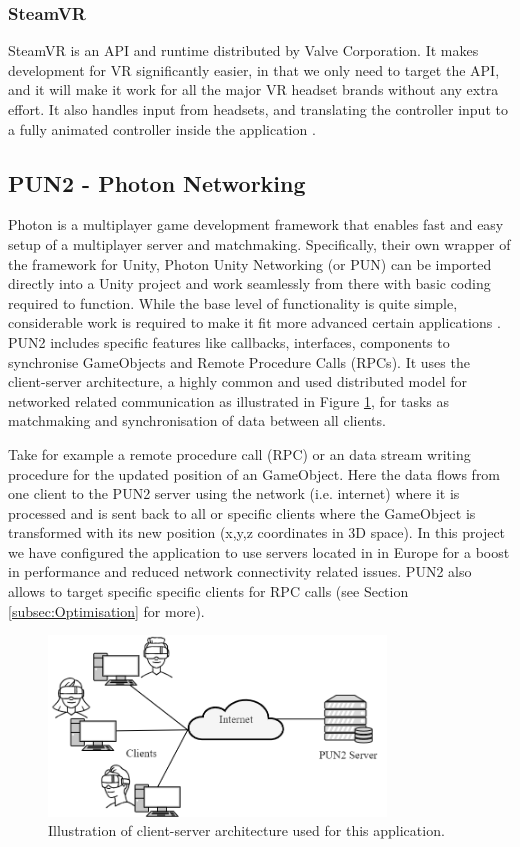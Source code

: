 \subsubsection{SteamVR}
SteamVR is an API and runtime distributed by Valve Corporation. It makes development for VR significantly easier, in that we only need to target the API, and it will make it work for all the major VR headset brands without any extra effort. It also handles input from headsets, and translating the controller input to a fully animated controller inside the application \cite{steamVR}\cite{steamVRAPI}.

\subsection{PUN2 - Photon Networking}
Photon is a multiplayer game development framework that enables fast and easy setup of a multiplayer server and matchmaking. Specifically, their own wrapper of the framework for Unity, Photon Unity Networking (or PUN) can be imported directly into a Unity project and work seamlessly from there with basic coding required to function. While the base level of functionality is quite simple, considerable work is required to make it fit more advanced certain applications \cite{PUN}. PUN2 includes specific features like callbacks, interfaces, components to synchronise GameObjects and Remote Procedure Calls (RPCs). It uses the client-server architecture, a highly common and used distributed model for networked related communication as illustrated in Figure \ref{fig:ClientServer}, for tasks as matchmaking and synchronisation of data between all clients. 

Take for example a remote procedure call (RPC) or an data stream writing procedure for the updated position of an GameObject. Here the data flows from one client to the PUN2 server using the network (i.e. internet) where it is processed and is sent back to all or specific clients where the GameObject is transformed with its new position (x,y,z coordinates in 3D space). In this project we have configured the application to use servers located in in Europe for a boost in performance and reduced network connectivity related issues. PUN2 also allows to target specific specific clients for RPC calls (see Section \ref{subsec:Optimisation} for more). 

\begin{figure}[!ht]
    \centering
    \includegraphics[width=0.8\textwidth]{./fig/background/ClientServer.png}
    \caption{Illustration of client-server architecture used for this application. }
    \label{fig:ClientServer}
\end{figure}

